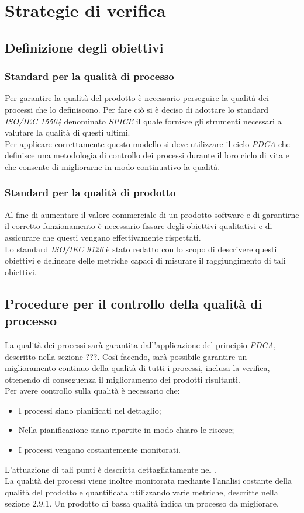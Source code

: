 \newpage
\section{Strategie di verifica}
\subsection{Definizione degli obiettivi}
\subsubsection{Standard per la qualità di processo}
Per garantire la qualità del prodotto è necessario perseguire la qualità dei processi che lo definiscono. Per fare ciò si è deciso di adottare lo standard \textit{ISO/IEC 15504} denominato \textit{SPICE} il quale fornisce gli strumenti necessari a valutare la qualità di questi ultimi.\\
Per applicare correttamente questo modello si deve utilizzare il ciclo \textit{PDCA} che definisce una metodologia di controllo dei processi durante il loro ciclo di vita e che consente di migliorarne in modo continuativo la qualità. 

\subsubsection{Standard per la qualità di prodotto}
Al fine di aumentare il valore commerciale di un prodotto software e di garantirne il corretto funzionamento è necessario fissare degli obiettivi qualitativi e di assicurare che questi vengano effettivamente rispettati.\\
Lo standard \textit{ISO/IEC 9126} è stato redatto con lo scopo di descrivere questi obiettivi e delineare delle metriche capaci di misurare il raggiungimento di tali obiettivi.

\subsection{Procedure per il controllo della qualità di processo}
La qualità dei processi sarà garantita dall'applicazione del principio \textit{PDCA}\ped, descritto nella sezione ???. Così facendo, sarà possibile garantire un miglioramento continuo della qualità di tutti i processi, inclusa la verifica, ottenendo di conseguenza il miglioramento dei prodotti risultanti.\\
Per avere controllo sulla qualità è necessario che:
\begin{itemize}
\item I processi siano pianificati nel dettaglio;
\item Nella pianificazione siano ripartite in modo chiaro le risorse;
\item I processi vengano costantemente monitorati.
\end{itemize}
L'attuazione di tali punti è descritta dettagliatamente nel \textit{\PdP}.\\
La qualità dei processi viene inoltre monitorata mediante l'analisi costante della qualità del prodotto e quantificata utilizzando varie metriche, descritte nella sezione 2.9.1. Un prodotto di bassa qualità indica un processo da migliorare.

